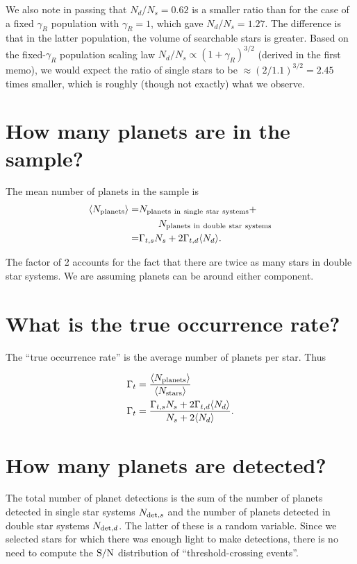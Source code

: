 \documentclass{emulateapj}
\begin{document}
We also note in passing that $N_d/N_s = 0.62$ is a smaller ratio than for the 
case of a fixed $\gamma_R$ population with $\gamma_R = 1$, which gave $N_d/N_s 
= 1.27$. The difference is that in the latter population, the volume of 
searchable stars is greater. Based on the fixed-$\gamma_R$ population scaling 
law $N_d / N_s \propto (1+\gamma_R)^{3/2}$ (derived in the first memo), we 
would expect the ratio of single stars to be $\approx (2/1.1)^{3/2} = 2.45$ 
times smaller, which is roughly (though not exactly) what we observe.


\section{How many planets are in the sample?}

The mean number of planets in the sample is
\begin{align}
\langle N_{\rm planets} \rangle
			   =& N_{\rm planets\ in\ single\ star\ systems}  +  \\
				  &\quad\quad N_{\rm planets\ in\ double\ star\ systems} 
				  \nonumber \\
			   =& \Gamma_{t,s} N_s + 2 \Gamma_{t,d} \langle N_d \rangle.
\end{align}

The factor of 2 accounts for the fact that there are twice as many stars in 
double star systems. We are assuming planets can be around either 
component.


\section{What is the true occurrence rate?}
\label{sec:true_rate}

The ``true occurrence rate'' is the average number of planets per star. Thus

\begin{align}
\Gamma_t &= \frac{\langle N_{\rm planets}\rangle}{\langle N_{\rm stars} \rangle} \\
\Gamma_t &= \frac{\Gamma_{t,s} N_s + 2 \Gamma_{t,d} \langle N_d\rangle}{N_s +
2\langle N_d\rangle}.
\label{eq:true_occ}
\end{align}


\section{How many planets are detected?}
The total number of planet detections is the sum of the number of planets 
detected in single star systems $N_{{\rm det},s}$ and the number of planets 
detected in double star systems $N_{{\rm det},d}$.
The latter of these is a random variable.
Since we selected stars for which there was enough light to make detections, 
there is no need to compute the ${\rm S/N}$ distribution of 
``threshold-crossing events''.
\end{document}
